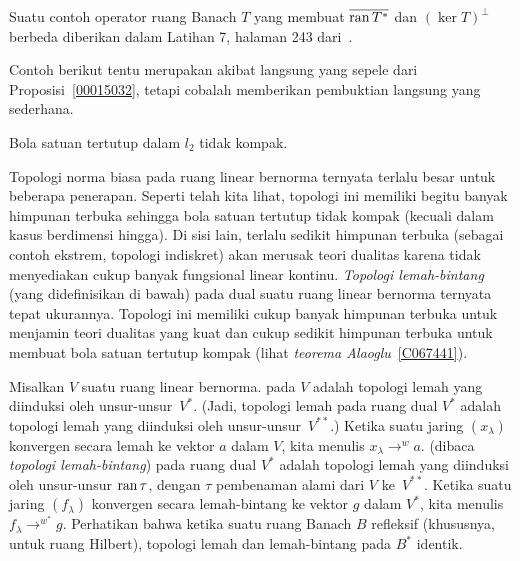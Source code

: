 \begin{exam} Suatu contoh operator ruang Banach $T$ yang membuat $\overline{\operatorname{ran} T^*}$ dan $(\ker T)^\perp$ berbeda
diberikan dalam Latihan 7, halaman 243 dari~\cite{BrownP:1970}.
\end{exam}

Contoh berikut tentu merupakan akibat langsung yang sepele dari Proposisi~\ref{00015032}, tetapi cobalah memberikan
pembuktian langsung yang sederhana.

\begin{exam}\label{X_l2ball_not_cpt} Bola satuan tertutup dalam $l_2$ tidak kompak.
\end{exam}

Topologi norma biasa pada ruang linear bernorma ternyata terlalu besar untuk beberapa penerapan.  Seperti telah kita lihat,
topologi ini memiliki begitu banyak himpunan terbuka sehingga bola satuan tertutup tidak kompak (kecuali dalam kasus berdimensi hingga). Di
sisi lain, terlalu sedikit himpunan terbuka (sebagai contoh ekstrem, topologi indiskret) akan merusak teori dualitas karena tidak
menyediakan cukup banyak fungsional linear kontinu.  \emph{Topologi lemah-bintang} (yang didefinisikan
di bawah) pada dual suatu ruang linear bernorma ternyata tepat ukurannya.  Topologi ini memiliki cukup banyak himpunan terbuka untuk menjamin
teori dualitas yang kuat dan cukup sedikit himpunan terbuka untuk membuat bola satuan tertutup kompak
(lihat \emph{teorema Alaoglu}~\ref{C067441}).

\begin{defn}\label{C067434} Misalkan $V$ suatu ruang linear bernorma. 
 pada $V$ adalah topologi lemah yang diinduksi oleh unsur-unsur~$V^*$. (Jadi,
topologi lemah pada ruang dual $V^*$ adalah topologi lemah yang diinduksi oleh
unsur-unsur~$V^{**}$.) Ketika suatu jaring $(x_\lambda)$ konvergen secara lemah ke vektor $a$ dalam $V$,
kita menulis
$x_\lambda \to^w a$. 
 (dibaca \emph{topologi lemah-bintang}) pada ruang dual $V^*$ adalah
topologi lemah yang diinduksi oleh unsur-unsur $\operatorname{ran} \tau$, dengan $\tau$ pembenaman alami
dari $V$ ke~$V^{**}$.  Ketika suatu jaring $(f_\lambda)$ konvergen secara lemah-bintang ke vektor $g$
dalam $V^*$, kita menulis
$f_\lambda \to^{w^*} g$. Perhatikan bahwa ketika suatu ruang Banach $B$ refleksif (khususnya, untuk ruang
Hilbert), topologi lemah dan lemah-bintang pada $B^*$ identik.
\end{defn}

